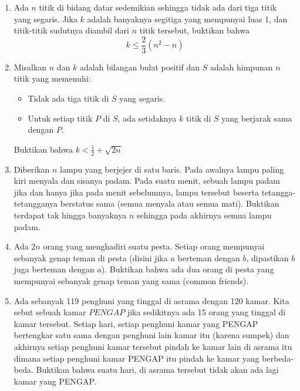 \documentclass[12pt]{article}
\begin{document}
\begin{enumerate}
	\item 
	Ada  $n$ titik di bidang datar sedemikian sehingga tidak ada dari tiga titik yang segaris. 
	Jika $k$ adalah banyaknya segitiga yang mempunyai luas 1, dan titik-titik sudutnya diambil dari $n$ titik tersebut, buktikan bahwa 
	\[
	k \leq \frac{2}{3}(n^2-n)
	\]
	
	\item
	Misalkan $n$ dan $k$ adalah bilangan bulat positif dan $S$ adalah himpunan $n$ titik yang memenuhi:
	\begin{itemize}
		\item Tidak ada tiga titik di $S$ yang segaris.
		
		\item Untuk setiap titik $P$ di $S$, ada setidaknya $k$ titik di $S$ yang berjarak sama dengan $P$.
	\end{itemize}
	Buktikan bahwa $k < \frac{1}{2} + \sqrt{2n}$
	
	\item
	Diberikan $n$ lampu yang berjejer di satu baris. Pada awalnya lampu paling kiri menyala dan sisanya padam. Pada suatu menit, sebuah lampu padam jika dan hanya jika pada menit sebelumnya, lampu tersebut beserta tetangga-tetangganya berstatus sama (semua menyala atau semua mati). Buktikan terdapat tak hingga banyaknya $n$ sehingga pada akhirnya semua lampu padam.
	
	\item
	Ada $2n$ orang yang menghadiri suatu pesta. Setiap orang mempunyai sebanyak genap teman di pesta (disini jika $a$ berteman dengan $b$, dipastikan $b$ juga berteman dengan $a$). Buktikan bahwa ada dua orang di pesta yang mempunyai sebanyak genap teman yang sama (common friends).
	
	\item
	Ada sebanyak 119 penghuni yang tinggal di asrama dengan 120 kamar. Kita sebut sebuah kamar $\textit{PENGAP}$ jika sedikitnya ada 15 orang yang tinggal di kamar tersebut. Setiap hari, setiap penghuni kamar yang PENGAP bertengkar satu sama dengan penghuni lain kamar itu (karena sumpek) dan akhirnya setiap penghuni kamar tersebut pindah ke kamar lain di asrama itu dimana setiap penghuni kamar PENGAP itu pindah ke kamar yang berbeda-beda. Buktikan bahwa suatu hari, di asrama tersebut tidak akan ada lagi kamar yang PENGAP.
\end{enumerate}
\end{document}
